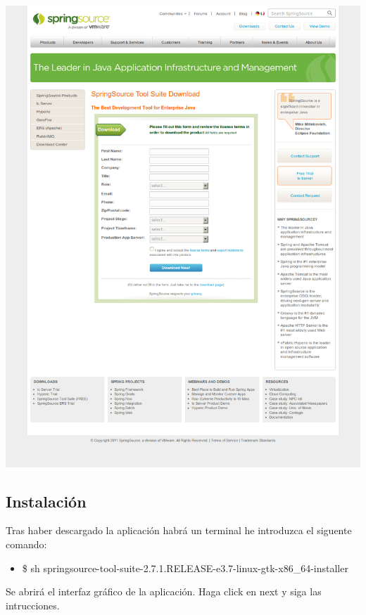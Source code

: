 \documentclass[a4paper,12pt,spanish]{article}
\begin{document}
\begin{center}
\includegraphics[scale=0.35]{SpringSourceToolSuiteDownload}
\end{center}

\subsection{Instalación}

Tras haber descargado la aplicación habrá un terminal he introduzca el siguente comando:

\begin{itemize}
\item \$ sh springsource-tool-suite-2.7.1.RELEASE-e3.7-linux-gtk-x86\_64-installer
\end{itemize}

Se abrirá el interfaz gráfico de la aplicación. 
Haga click en next y siga las intrucciones. 
\end{document}
